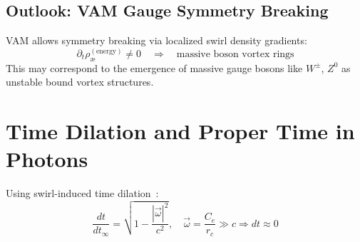         \subsection{Outlook: VAM Gauge Symmetry Breaking}

        VAM allows symmetry breaking via localized swirl density gradients:
        \[
            \partial_t \rho_\text{\ae}^{(\text{energy})} \neq 0 \quad \Rightarrow \quad \text{massive boson vortex rings}
        \]
        This may correspond to the emergence of massive gauge bosons like \( W^\pm \), \( Z^0 \) as unstable bound vortex structures.



\section{Time Dilation and Proper Time in Photons}

    Using swirl-induced time dilation~\cite{VAM-1}:
    \begin{equation}
        \frac{dt}{dt_\infty} = \sqrt{1 - \frac{|\vec{\omega}|^2}{c^2}}, \quad \vec{\omega} = \frac{C_e}{r_c} \gg c \Rightarrow dt \approx 0
    \end{equation}
